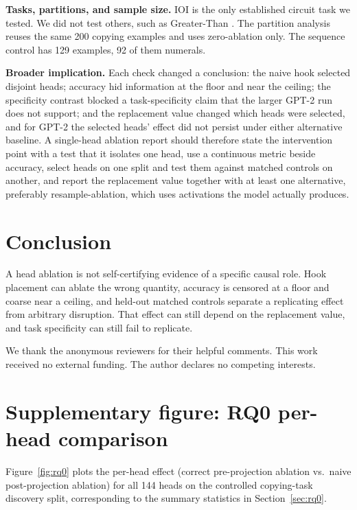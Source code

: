 \documentclass{article}
\begin{document}
\textbf{Tasks, partitions, and sample size.} IOI is the only established
circuit task we tested. We did not test others, such as Greater-Than
\citep{hanna2023greaterthan}. The partition analysis reuses the
same 200 copying examples and uses zero-ablation only. The sequence
control has 129 examples, 92 of them numerals.

\textbf{Broader implication.} Each check changed a conclusion: the naive
hook selected disjoint heads; accuracy hid information at the floor and
near the ceiling; the specificity contrast blocked a task-specificity
claim that the larger GPT-2 run does not support; and the replacement
value changed which heads were selected, and for GPT-2 the selected
heads' effect did not persist under either alternative baseline. A single-head ablation report should therefore
state the intervention point with a test that it isolates one head, use
a continuous metric beside accuracy, select heads on one split and test them
against matched controls on another, and report the replacement value together with
at least one alternative, preferably resample-ablation, which uses
activations the model actually produces.


\section{Conclusion}
\label{sec:conclusion}

A head ablation is not self-certifying evidence of a specific causal role.
Hook placement can ablate the wrong quantity, accuracy is censored at a
floor and coarse near a ceiling, and held-out matched controls separate a
replicating effect from arbitrary disruption. That effect can still
depend on the replacement value, and task specificity can still fail to
replicate.


\begin{ack}
We thank the anonymous reviewers for their helpful comments. This work
received no external funding. The author declares no competing interests.
\end{ack}



{\small

}

\newpage
\appendix

\section{Supplementary figure: RQ0 per-head comparison}
\label{app:rq0}

Figure~\ref{fig:rq0} plots the per-head effect (correct pre-projection
ablation vs.\ naive post-projection ablation) for all 144 heads on the
controlled copying-task discovery split, corresponding to the summary statistics in
Section~\ref{sec:rq0}.
\end{document}
